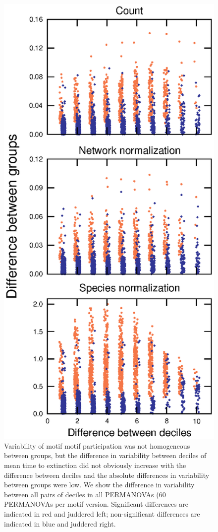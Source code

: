 \documentclass[12pt]{article}
\begin{document}
\begin{spacing}{2.0}
        \begin{figure}[hb!]
            \centering
            \includegraphics[height=.75\textheight]{figures/Tukey_differences.eps}
            \caption{Variability of motif motif participation was not homogeneous between groups, but the difference in variability between deciles of mean time to extinction did not obviously increase with the difference between deciles and the absolute differences in variability between groups were low. We show the difference in variability between all pairs of deciles in all PERMANOVAs (60 PERMANOVAs per motif version. Significant differences are indicated in red and juddered left; non-significant differences are indicated in blue and juddered right.}
            \label{fig:betadisper_Tukey}
        \end{figure}


\end{spacing}
\end{document}
